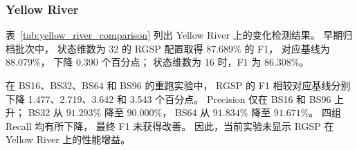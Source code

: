 \documentclass[journal]{IEEEtran}
\begin{document}
\subsubsection{Yellow River}
\label{sec:yellow_river_results}

表~\ref{tab:yellow_river_comparison}
列出 Yellow River 上的变化检测结果。
早期归档批次中，
状态维数为 32 的 RGSP 配置取得
87.689\% 的 F1，
对应基线为 88.079\%，
下降 0.390 个百分点；
状态维数为 16 时，F1 为 86.308\%。

在 BS16、BS32、BS64 和 BS96 的重跑实验中，
RGSP 的 F1 相较对应基线分别下降
1.477、2.719、3.642 和 3.543 个百分点。
Precision 仅在 BS16 和 BS96 上升；
BS32 从 $91.293\%$ 降至 $90.000\%$，
BS64 从 $91.834\%$ 降至 $91.671\%$。
四组 Recall 均有所下降，
最终 F1 未获得改善。
因此，当前实验未显示 RGSP 在
Yellow River 上的性能增益。
\end{document}
